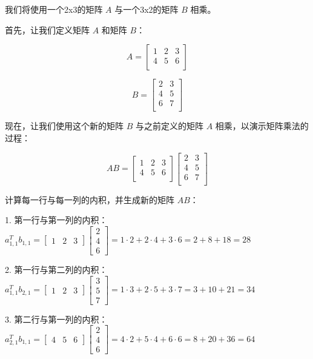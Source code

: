 \documentclass[lang=cn,newtx,10pt,scheme=chinese]{elegantbook}
\begin{document}
\begin{exercise}
    我们将使用一个2x3的矩阵 $A$ 与一个3x2的矩阵 $B$ 相乘。

首先，让我们定义矩阵 $A$ 和矩阵 $B$：

\[
A = \begin{bmatrix}
1 & 2 & 3 \\
4 & 5 & 6 \\
\end{bmatrix}
\]

\[
B = \begin{bmatrix}
2 & 3 \\
4 & 5 \\
6 & 7 \\
\end{bmatrix}
\]

现在，让我们使用这个新的矩阵 $B$ 与之前定义的矩阵 $A$ 相乘，以演示矩阵乘法的过程：

\[
AB = \begin{bmatrix}
1 & 2 & 3 \\
4 & 5 & 6 \\
\end{bmatrix} \begin{bmatrix}
2 & 3 \\
4 & 5 \\
6 & 7 \\
\end{bmatrix}
\]

计算每一行与每一列的内积，并生成新的矩阵 $AB$：

1. 第一行与第一列的内积： $a_{1,1}^T b_{1,1} = \begin{bmatrix} 1 & 2 & 3 \end{bmatrix} \begin{bmatrix} 2 \\ 4 \\ 6 \end{bmatrix} = 1 \cdot 2 + 2 \cdot 4 + 3 \cdot 6 = 2 + 8 + 18 = 28$

2. 第一行与第二列的内积： $a_{1,1}^T b_{2,1} = \begin{bmatrix} 1 & 2 & 3 \end{bmatrix} \begin{bmatrix} 3 \\ 5 \\ 7 \end{bmatrix} = 1 \cdot 3 + 2 \cdot 5 + 3 \cdot 7 = 3 + 10 + 21 = 34$

3. 第二行与第一列的内积： $a_{2,1}^T b_{1,1} = \begin{bmatrix} 4 & 5 & 6 \end{bmatrix} \begin{bmatrix} 2 \\ 4 \\ 6 \end{bmatrix} = 4 \cdot 2 + 5 \cdot 4 + 6 \cdot 6 = 8 + 20 + 36 = 64$


\end{exercise}
\end{document}
